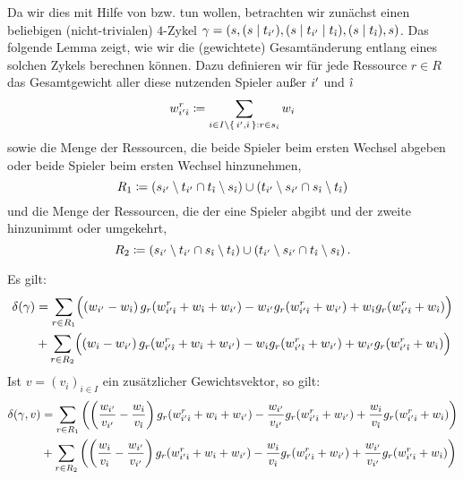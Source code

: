 \newcommand{\wrestr}{{w^r_{\ia\ib}}}

Da wir dies mit Hilfe von  bzw.  tun wollen, betrachten wir zunächst einen beliebigen (nicht-trivialen) $4$-Zykel $\gamma = (s, (s\mid t_{i'}), (s \mid t_{i'} \mid t_{\hat{\imath}}), (s \mid t_{\hat{\imath}}), s)$. Das folgende Lemma zeigt, wie wir die (gewichtete) Gesamtänderung entlang eines solchen Zykels berechnen können. Dazu definieren wir für jede Ressource $r \in R$ das Gesamtgewicht aller diese nutzenden Spieler außer ${i'}$ und ${\hat{\imath}}$
	\[\wrestr \coloneqq \sum_{i \in I\setminus\set{\ia, \ib}: r \in s_i} w_i \]
sowie die Menge der Ressourcen, die beide Spieler beim ersten Wechsel abgeben oder beide Spieler beim ersten Wechsel hinzunehmen,
	\[R_1 \coloneqq \left(s_{i'} \setminus t_{i'} \cap t_{\hat{\imath}} \setminus s_{\hat{\imath}}\right) \cup \left(t_{i'} \setminus s_{i'} \cap s_{\hat{\imath}} \setminus t_{\hat{\imath}}\right) \]
und die Menge der Ressourcen, die der eine Spieler abgibt und der zweite hinzunimmt oder umgekehrt,
	\[R_2 \coloneqq \left(s_{i'} \setminus t_{i'} \cap s_{\hat{\imath}} \setminus t_{\hat{\imath}}\right) \cup \left(t_{i'} \setminus s_{i'} \cap t_{\hat{\imath}} \setminus s_{\hat{\imath}}\right).\]	

\begin{lemma}\label{lemma:PfadAenderungen}
	Es gilt:
		\begin{align}\begin{split}  \label{eq:PfadAendUngew}
			\PfadAend(\gamma) &= \sum_{r \in R_1} \Bigl(\left(w_\ia - w_\ib\right) g_r(\wrestr + w_\ib + w_\ia) - w_\ia g_r(\wrestr + w_\ia)  + w_\ib g_r(\wrestr + w_\ib)\Bigr) \\
			&+ \sum_{r \in R_2} \Bigl(\left(w_\ib - w_\ia\right) g_r(\wrestr + w_\ib + w_\ia) - w_\ib g_r(\wrestr + w_\ia) + w_\ia g_r(\wrestr + w_\ib)\Bigr)
		\end{split}\end{align}
	Ist $v = (v_i)_{i \in I}$ ein zusätzlicher Gewichtsvektor, so gilt:
		\begin{align}\begin{split}\label{eq:PfadAendGew}
			\PfadAend(\gamma, v) &= \sum_{r \in R_1} \left(\left(\frac{w_\ia}{v_\ia} - \frac{w_\ib}{v_\ib}\right) g_r(\wrestr + w_\ib + w_\ia) - \frac{w_\ia}{v_\ia} g_r(\wrestr + w_\ia)  + \frac{w_\ib}{v_\ib} g_r(\wrestr + w_\ib)\right) \\
								&+ \sum_{r \in R_2} \left(\left(\frac{w_\ib}{v_\ib} - \frac{w_\ia}{v_\ia}\right) g_r(\wrestr + w_\ib + w_\ia) - \frac{w_\ib}{v_\ib} g_r(\wrestr + w_\ia) + \frac{w_\ia}{v_\ia} g_r(\wrestr + w_\ib)\right)
		\end{split}\end{align}
\end{lemma}

